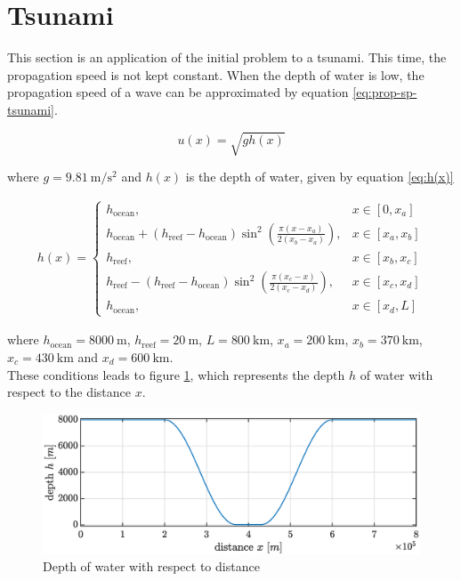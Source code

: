 \documentclass[a4paper,12pt,twoside]{article}
\newcommand{\bracket}[1]{\left(#1\right)}
\newcommand{\sqbracket}[1]{\left[#1\right]}
\begin{document}
    \section{Tsunami}
      This section is an application of the initial problem to a tsunami.
      This time, the propagation speed is not kept constant.
      When the depth of water is low, the propagation speed of a wave can be approximated by equation \eqref{eq:prop-sp-tsunami}.

      \begin{equation}
        u\bracket{x} = \sqrt{gh\bracket{x}}
        \label{eq:prop-sp-tsunami}
      \end{equation}

      where $g=\SI{9.81}{\meter\per\square\second}$ and $h\bracket{x}$ is the depth of water, given by equation \eqref{eq:h(x)}

      \begin{align}
        h(x)=
        \begin{cases}
          h_\text{ocean}, &x\in\sqbracket{0,x_a} \\
          h_\text{ocean} + \bracket{h_\text{reef} - h_\text{ocean}}\sin^2\bracket{\frac{\pi\bracket{x-x_a}}{2\bracket{x_b-x_a}}}, &x\in\sqbracket{x_a,x_b} \\
          h_\text{reef}, &x\in\sqbracket{x_b,x_c} \\
          h_\text{reef} - \bracket{h_\text{reef} - h_\text{ocean}}\sin^2\bracket{\frac{\pi\bracket{x_c - x}}{2\bracket{x_c-x_d}}}, &x\in\sqbracket{x_c,x_d} \\
          h_\text{ocean}, &x\in\sqbracket{x_d, L}
        \end{cases}
        \label{eq:h(x)}
      \end{align}

      where $h_\text{ocean} = \SI{8000}{\m}$, $h_\text{reef} = \SI{20}{\meter}$, $L=\SI{800}{\kilo\meter}$, $x_a = \SI{200}{\kilo\meter}$, $x_b = \SI{370}{\kilo\meter}$, $x_c=\SI{430}{\kilo\meter}$ and $x_d=\SI{600}{\kilo\meter}$.\\

      These conditions leads to figure \ref{fig:tsunami-depth}, which represents the depth $h$ of water with respect to the distance $x$.

      \begin{figure}[h]
        \centering
        \includegraphics[width=\textwidth]{graphs/tsunami_depth.eps}
        \caption{Depth of water with respect to distance}
        \label{fig:tsunami-depth}
      \end{figure}
\end{document}
